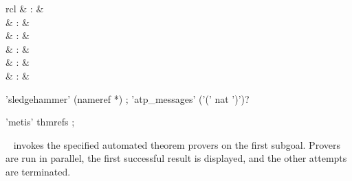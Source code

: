 \begin{isabellebody}
\begin{isamarkuptext}
  \begin{matharray}{rcl}
    \hypertarget{command.HOL.sledgehammer}{\hyperlink{command.HOL.sledgehammer}{\mbox{}}}\isa{{\isachardoublequote}\isactrlsup {\isacharasterisk}{\isachardoublequote}} & : &  \\
    \hypertarget{command.HOL.print-atps}{\hyperlink{command.HOL.print-atps}{\mbox{}}}\isa{{\isachardoublequote}\isactrlsup {\isacharasterisk}{\isachardoublequote}} & : &  \\
    \hypertarget{command.HOL.atp-info}{\hyperlink{command.HOL.atp-info}{\mbox{}}}\isa{{\isachardoublequote}\isactrlsup {\isacharasterisk}{\isachardoublequote}} & : &  \\
    \hypertarget{command.HOL.atp-kill}{\hyperlink{command.HOL.atp-kill}{\mbox{}}}\isa{{\isachardoublequote}\isactrlsup {\isacharasterisk}{\isachardoublequote}} & : &  \\
    \hypertarget{command.HOL.atp-messages}{\hyperlink{command.HOL.atp-messages}{\mbox{}}}\isa{{\isachardoublequote}\isactrlsup {\isacharasterisk}{\isachardoublequote}} & : &  \\
    \hypertarget{method.HOL.metis}{\hyperlink{method.HOL.metis}{\mbox{}}} & : &  \\
  \end{matharray}

  \begin{rail}
  'sledgehammer' (nameref *)
  ;
  'atp\_messages' ('(' nat ')')?

  'metis' thmrefs
  ;
  \end{rail}

  \begin{description}

  \item \hyperlink{command.HOL.sledgehammer}{\mbox{}}~
  invokes the specified automated theorem provers on the first
  subgoal.  Provers are run in parallel, the first successful result
  is displayed, and the other attempts are terminated.


\end{description}
\end{isamarkuptext}
\end{isabellebody}
